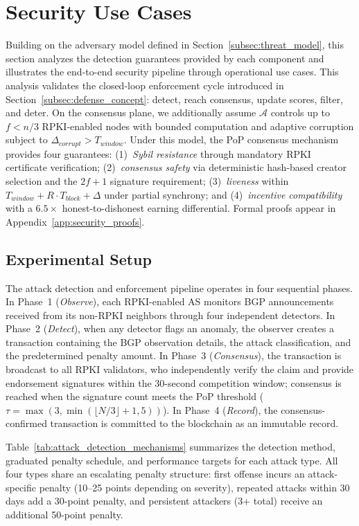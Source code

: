 \section{Security Use Cases}
\label{sec:threat_model}

Building on the adversary model defined in Section~\ref{subsec:threat_model}, this section analyzes the detection guarantees provided by each component and illustrates the end-to-end security pipeline through operational use cases. This analysis validates the closed-loop enforcement cycle introduced in Section~\ref{subsec:defense_concept}: detect, reach consensus, update scores, filter, and deter. On the consensus plane, we additionally assume $\mathcal{A}$ controls up to $f < n/3$ RPKI-enabled nodes with bounded computation and adaptive corruption subject to $\Delta_{corrupt} > T_{window}$. Under this model, the PoP consensus mechanism provides four guarantees: (1)~\emph{Sybil resistance} through mandatory RPKI certificate verification; (2)~\emph{consensus safety} via deterministic hash-based creator selection and the $2f{+}1$ signature requirement; (3)~\emph{liveness} within $T_{window} + R \cdot T_{block} + \Delta$ under partial synchrony; and (4)~\emph{incentive compatibility} with a $6.5\times$ honest-to-dishonest earning differential. Formal proofs appear in Appendix~\ref{app:security_proofs}.


\subsection{Experimental Setup}
\label{subsec:detection_guarantees}

The attack detection and enforcement pipeline operates in four sequential phases. In Phase~1 (\emph{Observe}), each RPKI-enabled AS monitors BGP announcements received from its non-RPKI neighbors through four independent detectors. In Phase~2 (\emph{Detect}), when any detector flags an anomaly, the observer creates a transaction containing the BGP observation details, the attack classification, and the predetermined penalty amount. In Phase~3 (\emph{Consensus}), the transaction is broadcast to all RPKI validators, who independently verify the claim and provide endorsement signatures within the 30-second competition window; consensus is reached when the signature count meets the PoP threshold ($\tau = \max(3, \min(\lfloor N/3 \rfloor + 1, 5))$). In Phase~4 (\emph{Record}), the consensus-confirmed transaction is committed to the blockchain as an immutable record.

Table~\ref{tab:attack_detection_mechanisms} summarizes the detection method, graduated penalty schedule, and performance targets for each attack type. All four types share an escalating penalty structure: first offense incurs an attack-specific penalty (10--25 points depending on severity), repeated attacks within 30 days add a 30-point penalty, and persistent attackers (3+ total) receive an additional 50-point penalty.

